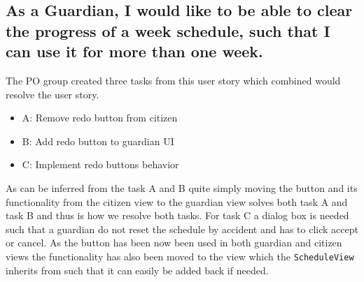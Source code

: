 \subsection{As a Guardian, I would like to be able to clear the progress of a week schedule, such that I can use it for more than one week.}
The PO group created three tasks from this user story which combined would resolve the user story.
\begin{itemize}
    \item A: Remove redo button from citizen
    \item B: Add redo button to guardian UI
    \item C: Implement redo buttons behavior
\end{itemize}
As can be inferred from the task A and B quite simply moving the button and its functionality from the citizen view to the guardian view solves both task A and task B and thus is how we resolve both tasks.
For task C a dialog box is needed such that a guardian do not reset the schedule by accident and has to click accept or cancel.
As the button has been now been used in both guardian and citizen views the functionality has also been moved to the view which the \texttt{ScheduleView} inherits from such that it can easily be added back if needed.